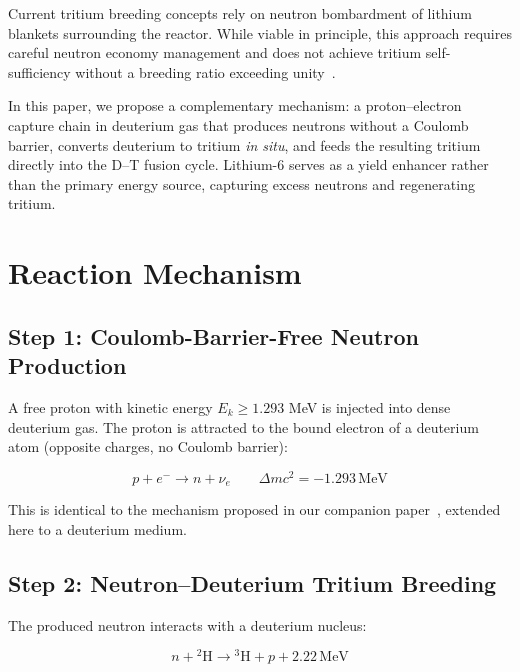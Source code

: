 \documentclass[12pt,a4paper]{article}
\begin{document}
Current tritium breeding concepts rely on neutron bombardment of
lithium blankets surrounding the reactor. While viable in principle,
this approach requires careful neutron economy management and does
not achieve tritium self-sufficiency without a breeding ratio
exceeding unity~\cite{abdou2021}.

In this paper, we propose a complementary mechanism: a
proton--electron capture chain in deuterium gas that produces
neutrons without a Coulomb barrier, converts deuterium to tritium
\emph{in situ}, and feeds the resulting tritium directly into the
D--T fusion cycle. Lithium-6 serves as a yield enhancer rather than
the primary energy source, capturing excess neutrons and regenerating
tritium.

\section{Reaction Mechanism}

\subsection{Step 1: Coulomb-Barrier-Free Neutron Production}

A free proton with kinetic energy $E_k \geq 1.293$ MeV is injected
into dense deuterium gas. The proton is attracted to the bound
electron of a deuterium atom (opposite charges, no Coulomb barrier):

\begin{equation}
  p + e^- \rightarrow n + \nu_e
  \qquad \Delta mc^2 = -1.293\,\text{MeV}
  \label{eq:capture}
\end{equation}

This is identical to the mechanism proposed in our companion
paper~\cite{aydogan2026a}, extended here to a deuterium medium.

\subsection{Step 2: Neutron--Deuterium Tritium Breeding}

The produced neutron interacts with a deuterium nucleus:

\begin{equation}
  n + {}^2\text{H} \rightarrow {}^3\text{H} + p + 2.22\,\text{MeV}
  \label{eq:breeding}
\end{equation}
\end{document}
